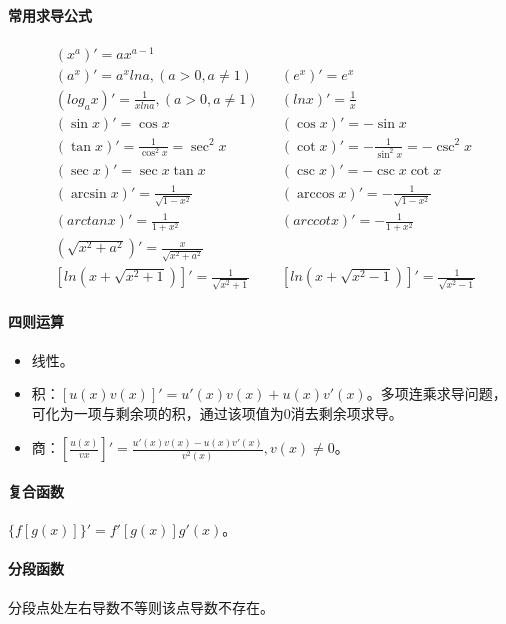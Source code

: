 \documentclass[
12pt, %
a4paper, 
oneside, %
headinclude,footinclude, %
]{scrartcl}
\begin{document}
\paragraph{常用求导公式}
\begin{align*}
&(x^a)' = ax^{a - 1} \\
&(a^x)' = a^x lna,(a > 0, a \neq 1)& &(e^x)' = e^x \\
&(log_a x)' = \frac{1}{x lna},(a > 0, a \neq 1)& &(ln x)' = \frac{1}{x} \\
&(\sin x)' = \cos x& &(\cos x)' = -\sin x \\
&(\tan x)' = \frac{1}{\cos^2 x} = \sec^2 x& &(\cot x)' = -\frac{1}{\sin^2 x} = -\csc^2 x \\
&(\sec x)' = \sec x \tan x& &(\csc x)' = -\csc x \cot x \\
&(\arcsin x)' = \frac{1}{\sqrt{1 - x^2}}& &(\arccos x)' = -\frac{1}{\sqrt{1 - x^2}} \\
&(arctan x)' = \frac{1}{1 + x^2}& &(arccot x)' = -\frac{1}{1 + x^2} \\
&(\sqrt{x^2 + a^2})' = \frac{x}{\sqrt{x^2 + a^2}} \\
&[ln(x + \sqrt{x^2 + 1})]' = \frac{1}{\sqrt{x^2 + 1}}& &[ln(x + \sqrt{x^2 - 1})]' = \frac{1}{\sqrt{x^2 - 1}} 
\end{align*}
\paragraph{四则运算}
\begin{itemize}
\item 线性。
\item 积：$ [u(x)v(x)]' = u'(x)v(x) + u(x)v'(x) $。多项连乘求导问题，可化为一项与剩余项的积，通过该项值为$ 0 $消去剩余项求导。
\item 商：$ [\frac{u(x)}{v{x}}]' = \frac{u'(x)v(x) - u(x)v'(x)}{v^2(x)}, v(x) \neq 0 $。
\end{itemize}
\paragraph{复合函数}
$ \{f[g(x)]\}' = f'[g(x)]g'(x) $。
\paragraph{分段函数}
分段点处左右导数不等则该点导数不存在。
\end{document}
